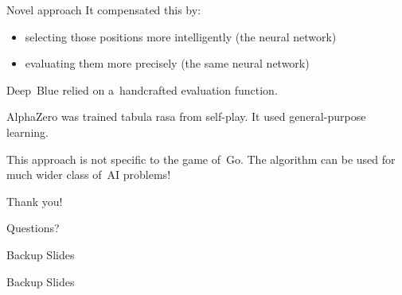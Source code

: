 \documentclass{beamer}
\begin{document}
{\begin{frame}{Novel approach}
      It compensated this by:
      \begin{itemize}[<+->]
        \item selecting those positions \alert{more intelligently} (the neural network)
        \item evaluating them \alert{more precisely} (the same neural network)
      \end{itemize}
      \pause

      Deep~Blue relied on a~handcrafted evaluation function.
      \pause

      AlphaZero was trained \alert{tabula rasa} from self-play.
      It used \alert{general-purpose} learning.
      \pause

      This approach is not specific to the game of~Go.
      The algorithm can be used \alert{for much wider class} of~AI problems!
    \end{frame}
  }

  \begin{frame}[standout]
    \begin{center}
      Thank you!

      Questions?
    \end{center}
  \end{frame}

  \begin{frame}[standout]
    Backup Slides
  \end{frame}


  \appendix
  \begin{frame}[standout]
    Backup Slides
  \end{frame}
\end{document}
